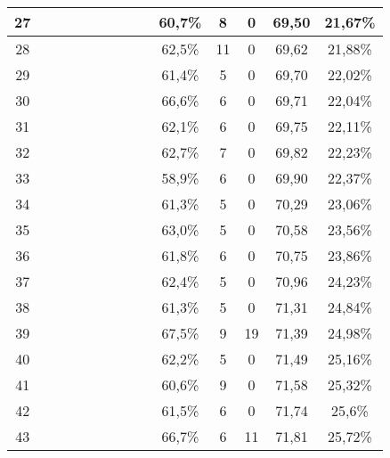 \begin{longtable}{|c|c|c|c|c|c|c|c|c|c|c|c|c|c|}
27  &  \x    & \x    & \x    & \x    &       & \x\m  &       &       & 60,7\% &  8  & 0  & 69,50 & 21,67\% \\ \hline
28  &  \x    & \x    & \x    & \x    & \x    &       &       &       & 62,5\% &  11 & 0  & 69,62 & 21,88\% \\ \hline
29  &  \x    & \x    & \x    & \x    &       & \x    & \x    &       & 61,4\% &  5  & 0  & 69,70 & 22,02\% \\ \hline
30  &  \x    & \x    & \x    & \x    & \x\m  &       &       & \x    & 66,6\% &  6  & 0  & 69,71 & 22,04\% \\ \hline
31  &  \x    & \x    & \x    &       & \x    &       &       & \x    & 62,1\% &  6  & 0  & 69,75 & 22,11\% \\ \hline
32  &  \x    & \x    & \x    & \x    & \x    &       & \x    &       & 62,7\% &  7  & 0  & 69,82 & 22,23\% \\ \hline
33  &  \x    & \x    & \x    &       &       &       &       &       & 58,9\% &  6  & 0  & 69,90 & 22,37\% \\ \hline
34  &  \x    & \x    & \x    & \x    &       & \x\m  & \x    &       & 61,3\% &  5  & 0  & 70,29 & 23,06\% \\ \hline
35  &  \x    & \x    & \x    &       & \x    & \x    & \x    &       & 63,0\% &  5  & 0  & 70,58 & 23,56\% \\ \hline
36  &  \x    & \x    & \x    & \x    & \x    & \x    &       & \x    & 61,8\% &  6  & 0  & 70,75 & 23,86\% \\ \hline
37  &  \x    & \x    & \x    &       & \x    & \x    &       & \x\m  & 62,4\% &  5  & 0  & 70,96 & 24,23\% \\ \hline
38  &  \x    & \x    & \x    & \x    &       &       &       &       & 61,3\% &  5  & 0  & 71,31 & 24,84\% \\ \hline
39  &  \x    & \x    &       & \x    & \x\m  & \x\m  &       &       & 67,5\% &  9  & 19 & 71,39 & 24,98\% \\ \hline
40  &  \x    & \x    & \x    &       & \x    & \x    &       &       & 62,2\% &  5  & 0  & 71,49 & 25,16\% \\ \hline
41  &  \x    & \x    & \x    & \x    &       &       &       &       & 60,6\% &  9  & 0  & 71,58 & 25,32\% \\ \hline
42  &  \x    & \x    & \x    & \x    &       & \x    &       & \x\m  & 61,5\% &  6  & 0  & 71,74 & 25,6\% \\ \hline
43  &  \x    & \x    & \x    &       & \x\m  &       & \x\m  &       & 66,7\% &  6  & 11 & 71,81 & 25,72\% \\ \hline

\end{longtable}
